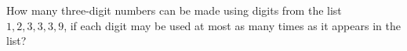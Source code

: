 How many three-digit numbers can be made using digits from the list $1,2,3,3,3,9$, if each digit may be used at most as many times as it appears in the list?

